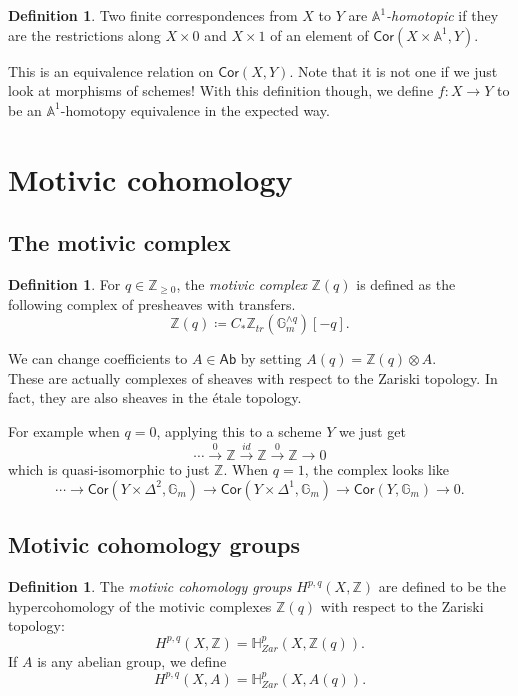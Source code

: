 \documentclass[leqno, openany]{memoir}
\theoremstyle{definition}
\newtheorem{defn}[thm]{Definition}
\theoremstyle{remark}
\theoremstyle{plain}
\theoremstyle{definition}
\theoremstyle{remark}
\newcommand{\A}{\mathbb{A}}
\newcommand{\G}{\mathbb{G}}
\newcommand{\Z}{\mathbb{Z}}
\newcommand{\ms}[1]{\mathsf{#1}}
\newcommand{\Cor}{\mathsf{Cor}}
\begin{document}
\begin{defn}
Two finite correspondences from $X$ to $Y$ are \textit{$\A^1$-homotopic} if they are the restrictions along $X\times 0$ and $X\times 1$ of an element of $\Cor(X\times \A^1, Y)$. 
\end{defn}

This is an equivalence relation on $\Cor(X, Y)$.  Note that it is not one if we just look at morphisms of schemes!  With this definition though, we define $f:X\rightarrow Y$ to be an $\A^1$-homotopy equivalence in the expected way.


\section{Motivic cohomology} 

\subsection{The motivic complex}

\begin{defn}
For $q\in \Z_{\ge 0}$, the \textit{motivic complex} $\Z(q)$ is defined as the following complex of presheaves with transfers. 
\[
\Z(q)\coloneqq C_*\Z_{tr}(\G_m^{\wedge q})[-q].
\]
\end{defn}

We can change coefficients to $A\in \ms{Ab}$ by setting $A(q)=\Z(q)\otimes A$.  \\  

These are actually complexes of sheaves with respect to the Zariski topology.  In fact, they are also sheaves in the \'etale topology.  

For example when $q=0$, applying this to a scheme $Y$ we just get 
\[
\cdots\xrightarrow{0} \Z\xrightarrow{id} \Z\xrightarrow{0}\Z\rightarrow 0 
\]
which is quasi-isomorphic to just $\Z$.  When $q=1$, the complex looks like 
\[
\cdots\xrightarrow{} \Cor(Y\times\Delta^2, \G_m) \xrightarrow{} \Cor(Y\times\Delta^1, \G_m)\xrightarrow{}\Cor(Y, \G_m)\rightarrow 0.
\]

\subsection{Motivic cohomology groups}

\begin{defn}
    The \textit{motivic cohomology groups} $H^{p,q}(X, \Z)$ are defined to be the hypercohomology of the motivic complexes $\Z(q)$ with respect to the Zariski topology:
    \[ H^{p,q}(X, \Z) = \mathbb{H}^p_{Zar}(X, \Z(q)). \]
    If $A$ is any abelian group, we define
    \[ H^{p,q}(X, A) = \mathbb{H}^p_{Zar}(X, A(q)). \]
\end{defn}
\end{document}
